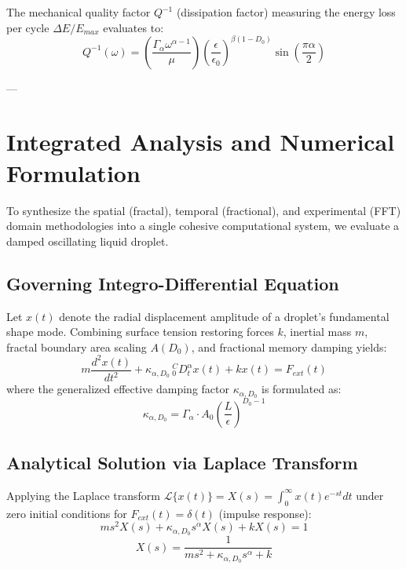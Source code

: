 \documentclass[11pt,a4paper]{article}
\begin{document}
The mechanical quality factor $Q^{-1}$ (dissipation factor) measuring the energy loss per cycle $\Delta E / E_{max}$ evaluates to:
\begin{equation}
Q^{-1}(\omega) = \left( \frac{\Gamma_\alpha \omega^{\alpha - 1}}{\mu} \right) \left( \frac{\epsilon}{\epsilon_0} \right)^{\beta(1 - D_0)} \sin\left( \frac{\pi \alpha}{2} \right)
\end{equation}

---

\section{Integrated Analysis and Numerical Formulation} \label{sec:analysis}

To synthesize the spatial (fractal), temporal (fractional), and experimental (FFT) domain methodologies into a single cohesive computational system, we evaluate a damped oscillating liquid droplet.

\subsection{Governing Integro-Differential Equation}

Let $x(t)$ denote the radial displacement amplitude of a droplet's fundamental shape mode. Combining surface tension restoring forces $k$, inertial mass $m$, fractal boundary area scaling $A(D_0)$, and fractional memory damping yields:
\begin{equation}
m \frac{d^2 x(t)}{dt^2} + \kappa_{\alpha, D_0} \, {}_{0}^C D_t^\alpha x(t) + k x(t) = F_{ext}(t)
\end{equation}
where the generalized effective damping factor $\kappa_{\alpha, D_0}$ is formulated as:
\begin{equation}
\kappa_{\alpha, D_0} = \Gamma_\alpha \cdot A_0 \left( \frac{L}{\epsilon} \right)^{D_0 - 1}
\end{equation}

\subsection{Analytical Solution via Laplace Transform}

Applying the Laplace transform $\mathcal{L}\{x(t)\} = X(s) = \int_0^\infty x(t) e^{-st} dt$ under zero initial conditions for $F_{ext}(t) = \delta(t)$ (impulse response):
\begin{equation}
m s^2 X(s) + \kappa_{\alpha, D_0} s^\alpha X(s) + k X(s) = 1
\end{equation}
\begin{equation}
X(s) = \frac{1}{m s^2 + \kappa_{\alpha, D_0} s^\alpha + k}
\end{equation}
\end{document}
